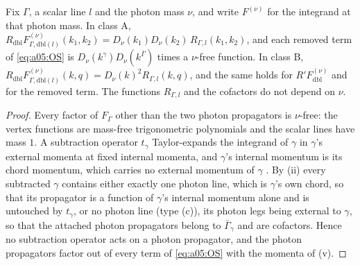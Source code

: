 \begin{lemma}\label{lem:a05:PF}
Fix $\Gamma$, a scalar line $l$ and the photon mass $\nu$, and write $F^{(\nu)}$ for the integrand at that photon mass. In class A, $R_{\mathrm{dbl}}F^{(\nu)}_{\Gamma,\mathrm{dbl}(l)}(k_1,k_2)=D_\nu(k_1)D_\nu(k_2)\,R_{\Gamma,l}(k_1,k_2)$, and each removed term of \eqref{eq:a05:OS} is $D_\nu(k^\gamma)D_\nu(k^{\bar\Gamma})$ times a $\nu$-free function. In class B, $R_{\mathrm{dbl}}F^{(\nu)}_{\Gamma,\mathrm{dbl}(l)}(k,q)=D_\nu(k)^2R_{\Gamma,l}(k,q)$, and the same holds for $R'F^{(\nu)}_{\mathrm{dbl}}$ and for the removed term. The functions $R_{\Gamma,l}$ and the cofactors do not depend on $\nu$.
\end{lemma}
\begin{proof}
Every factor of $F_\Gamma$ other than the two photon propagators is $\nu$-free: the vertex functions are mass-free trigonometric polynomials and the scalar lines have mass $1$. A subtraction operator $t_\gamma$ Taylor-expands the integrand of $\gamma$ in $\gamma$'s external momenta at fixed internal momenta, and $\gamma$'s internal momentum is its chord momentum, which carries no external momentum of $\gamma$ \cite[(2-16), (2-24)]{Rei88b}. By (ii) every subtracted $\gamma$ contains either exactly one photon line, which is $\gamma$'s own chord, so that its propagator is a function of $\gamma$'s internal momentum alone and is untouched by $t_\gamma$, or no photon line (type (c)), its photon legs being external to $\gamma$, so that the attached photon propagators belong to $\bar\Gamma_\gamma$ and are cofactors. Hence no subtraction operator acts on a photon propagator, and the photon propagators factor out of every term of \eqref{eq:a05:OS} with the momenta of (v).
\end{proof}

